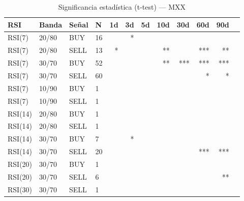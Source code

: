 %
\begin{table}[htbp]
    \centering
    \caption{Significancia estadística (t-test) --- MXX}
    \label{tab:sig_mxx}
    \small
    \begin{tabular}{llllrrrrrrrr}
        \toprule
        \textbf{RSI} & \textbf{Banda} & \textbf{Se\~{n}al} & \textbf{N} & \textbf{1d} & \textbf{3d} & \textbf{5d} & \textbf{10d} & \textbf{30d} & \textbf{60d} & \textbf{90d} \\
        \midrule
        RSI(7) & 20/80 & BUY & 16 &  & * &  &  &  &  &  \\
        RSI(7) & 20/80 & SELL & 13 & * &  &  & ** &  & *** & ** \\
        RSI(7) & 30/70 & BUY & 52 &  &  &  & ** & *** & *** & *** \\
        RSI(7) & 30/70 & SELL & 60 &  &  &  &  &  & * & * \\
        RSI(7) & 10/90 & BUY & 1 &  &  &  &  &  &  &  \\
        RSI(7) & 10/90 & SELL & 1 &  &  &  &  &  &  &  \\
        \midrule
        RSI(14) & 20/80 & BUY & 1 &  &  &  &  &  &  &  \\
        RSI(14) & 20/80 & SELL & 1 &  &  &  &  &  &  &  \\
        RSI(14) & 30/70 & BUY & 7 &  & * &  &  &  &  &  \\
        RSI(14) & 30/70 & SELL & 20 &  &  &  &  &  & *** & *** \\
        \midrule
        RSI(20) & 30/70 & BUY & 1 &  &  &  &  &  &  &  \\
        RSI(20) & 30/70 & SELL & 6 &  &  &  &  &  &  & ** \\
        \midrule
        RSI(30) & 30/70 & SELL & 1 &  &  &  &  &  &  &  \\
        \bottomrule
    \end{tabular}
\end{table}
